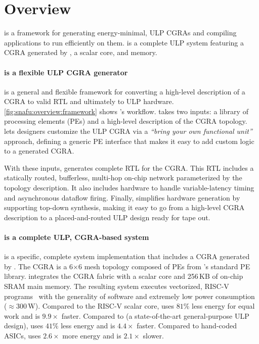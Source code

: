 \figSNAFUOverviewFramework
\figSNAFUOverviewExecute
\section{Overview}
\label{snafu:overview}

\snafuframe is a framework for generating energy-minimal, ULP CGRAs
and compiling applications to run efficiently on them.
%
\snafuarch is a complete ULP system featuring a CGRA generated by \snafuframe,
a scalar core, and memory.

\paragraph{\snafuframe is a flexible ULP CGRA generator}
\snafuframe is a general and flexible framework for converting a high-level
description of a CGRA to valid RTL and ultimately to ULP hardware.
% 
\autoref{fig:snafu:overview:framework} shows \snafuframe's workflow.
% 
\snafuframe takes two inputs: a library of processing elements (PEs) and a high-level description of the CGRA topology.
% 
\snafuframe lets designers customize the ULP CGRA
%
via a {\em ``bring your own functional unit''} approach,
defining a generic PE interface that makes it easy to add custom logic to a generated CGRA.

With these inputs, \snafuframe generates complete RTL for the CGRA.
% 
This RTL includes a statically routed, bufferless, multi-hop on-chip network parameterized by the topology description.
% 
It also includes hardware to handle variable-latency timing and asynchronous dataflow firing.
%
Finally, \snafuframe simplifies hardware generation by supporting top-down synthesis,
making it easy to go from a high-level CGRA description to a placed-and-routed ULP design ready for tape out.

\paragraph{\snafuarch is a complete ULP, CGRA-based system}
\snafuarch is a specific, complete system implementation that includes a CGRA generated by \snafuframe.
The CGRA is a 6$\times$6 mesh topology composed of PEs from \snafuframe's standard PE library.
%
\snafuarch integrates the CGRA fabric with a scalar core and 256\,KB of on-chip SRAM main memory.
%
The resulting system executes vectorized, RISC-V programs~\cite{riscv_2019}
with the generality of software and extremely low power consumption ($\approx$300\,\textmu W).  
% 
Compared to the \mbox{RISC-V} scalar core, \snafuarch uses $81\%$ less energy for equal work and is $9.9\times$ faster.
% 
Compared to \manic (a state-of-the-art general-purpose ULP design), \snafuarch uses $41\%$ less energy and is $4.4\times$ faster.
%
Compared to hand-coded ASICs, \snafuarch uses $2.6\times$ more energy and is $2.1\times$ slower.

